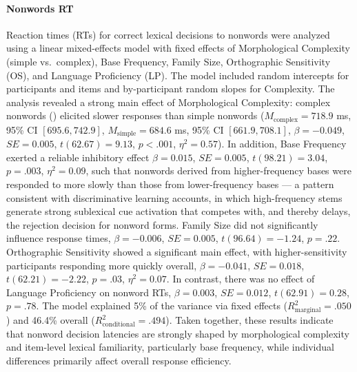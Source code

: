 \documentclass[utf8]{FrontiersinHarvard} %
\begin{document}
\paragraph*{Nonwords RT}
Reaction times (RTs) for correct lexical decisions to nonwords were analyzed using a linear mixed-effects model with fixed effects of Morphological Complexity (simple vs.\ complex), Base Frequency, Family Size, Orthographic Sensitivity (OS), and Language Proficiency (LP). The model included random intercepts for participants and items and by-participant random slopes for Complexity. The analysis revealed a strong main effect of Morphological Complexity: complex nonwords () elicited  slower responses than simple nonwords ($M_{\mathrm{complex}} = 718.9$ ms, 95\% CI $[695.6, 742.9]$, $M_{\mathrm{simple}} = 684.6$ ms, 95\% CI $[661.9, 708.1]$, $\beta = -0.049$, $SE = 0.005$, $t(62.67) = 9.13$, $p < .001$, $\eta^2 = 0.57$). In addition, Base Frequency exerted a reliable inhibitory effect $\beta = 0.015$, $SE = 0.005$, $t(98.21) = 3.04$, $p = .003$, $\eta^2 = 0.09$, such that nonwords derived from higher-frequency bases were responded to more slowly than those from lower-frequency bases — a pattern consistent with discriminative learning accounts, in which high-frequency stems generate strong sublexical cue activation that competes with, and thereby delays, the rejection decision for nonword forms. Family Size did not significantly influence response times, $\beta = -0.006$, $SE = 0.005$, $t(96.64) = -1.24$, $p = .22$. Orthographic Sensitivity showed a significant main effect, with higher-sensitivity participants responding more quickly overall, $\beta = -0.041$, $SE = 0.018$, $t(62.21) = -2.22$, $p = .03$, $\eta^2 = 0.07$. In contrast, there was no effect of Language Proficiency on nonword RTs, $\beta = 0.003$, $SE = 0.012$, $t(62.91) = 0.28$, $p = .78$. The model explained 5\% of the variance via fixed effects ($R^2_{\mathrm{marginal}} = .050$) and 46.4\% overall ($R^2_{\mathrm{conditional}} = .494$). Taken together, these results indicate that nonword decision latencies are strongly shaped by morphological complexity and item-level lexical familiarity, particularly base frequency, while individual differences primarily affect overall response efficiency. 
\end{document}
